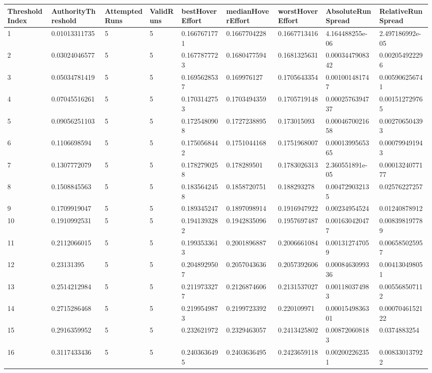 \begin{tabular}{@{}lllllllll@{}}
\toprule
ThresholdIndex & AuthorityThreshold & AttemptedRuns & ValidRuns & bestHoverEffort & medianHoverEffort & worstHoverEffort & AbsoluteRunSpread & RelativeRunSpread \\
\midrule
1 & 0.01013311735 & 5 & 5 & 0.1667671771 & 0.1667704228 & 0.1667713416 & 4.164488255e-06 & 2.497186992e-05 \\
2 & 0.03024046577 & 5 & 5 & 0.1677877723 & 0.1680477594 & 0.1681325631 & 0.0003447908342 & 0.002054922296 \\
3 & 0.05034781419 & 5 & 5 & 0.1695628537 & 0.169976127 & 0.1705643354 & 0.001001481747 & 0.005906256741 \\
4 & 0.07045516261 & 5 & 5 & 0.1703142753 & 0.1703494359 & 0.1705719148 & 0.0002576394737 & 0.001512729765 \\
5 & 0.09056251103 & 5 & 5 & 0.1725480908 & 0.1727238895 & 0.173015093 & 0.0004670021658 & 0.002706504393 \\
6 & 0.1106698594 & 5 & 5 & 0.1750568442 & 0.1751044168 & 0.1751968007 & 0.0001399565365 & 0.000799491943 \\
7 & 0.1307772079 & 5 & 5 & 0.1782790258 & 0.178289501 & 0.1783026313 & 2.360551891e-05 & 0.0001324077177 \\
8 & 0.1508845563 & 5 & 5 & 0.1835642458 & 0.1858720751 & 0.188293278 & 0.004729032135 & 0.02576227257 \\
9 & 0.1709919047 & 5 & 5 & 0.189345247 & 0.1897098914 & 0.1916947922 & 0.00234954524 & 0.01240878912 \\
10 & 0.1910992531 & 5 & 5 & 0.1941393282 & 0.1942835096 & 0.1957697487 & 0.001630420477 & 0.008398197789 \\
11 & 0.2112066015 & 5 & 5 & 0.1993533613 & 0.2001896887 & 0.2006661084 & 0.001312747059 & 0.006585025957 \\
12 & 0.23131395 & 5 & 5 & 0.2048929507 & 0.2057043636 & 0.2057392606 & 0.0008463099336 & 0.004130498051 \\
13 & 0.2514212984 & 5 & 5 & 0.2119733277 & 0.2126874606 & 0.2131537027 & 0.001180374983 & 0.005568507112 \\
14 & 0.2715286468 & 5 & 5 & 0.2199549873 & 0.2199723392 & 0.220109971 & 0.0001549836301 & 0.0007046152122 \\
15 & 0.2916359952 & 5 & 5 & 0.232621972 & 0.2329463057 & 0.2413425802 & 0.008720608183 & 0.0374883254 \\
16 & 0.3117433436 & 5 & 5 & 0.2403636495 & 0.2403636495 & 0.2423659118 & 0.002002262351 & 0.008330137922 \\

\end{tabular}
